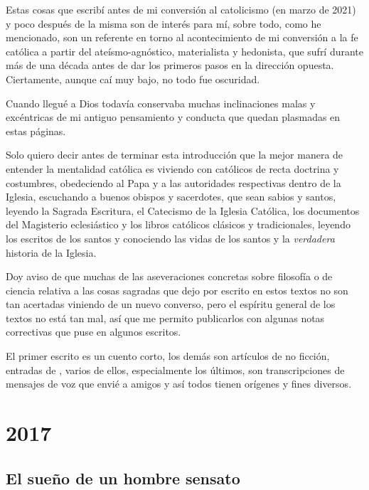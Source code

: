 \documentclass[12pt]{article}
\begin{document}
	Estas cosas que escribí antes de mi conversión al catolicismo (en marzo
	de 2021) y poco después de la misma son de interés
	 para mí, sobre todo, como he mencionado, son un
	referente en torno al acontecimiento de mi conversión a la fe católica a
	partir del ateísmo-agnóstico, materialista y hedonista, que sufrí
	durante más de una década antes de dar los primeros pasos en la
	dirección opuesta. Ciertamente, aunque caí muy bajo, no todo fue
	oscuridad.

	Cuando llegué a Dios todavía conservaba muchas inclinaciones malas y
	excéntricas de mi antiguo pensamiento y conducta que quedan plasmadas en
	estas páginas.

	Solo quiero decir antes de terminar esta introducción que la mejor
	manera de entender la mentalidad católica es viviendo con católicos de
	recta doctrina y costumbres, obedeciendo al Papa y a las autoridades
	respectivas dentro de la Iglesia, escuchando a buenos obispos y
	sacerdotes, que sean sabios y santos, leyendo la Sagrada Escritura, el
	Catecismo de la Iglesia Católica, los documentos del Magisterio
	eclesiástico y los libros católicos clásicos y tradicionales, leyendo 
	los escritos
	de los santos y conociendo las vidas de los santos y la
	\textit{verdadera} historia de la Iglesia.

	Doy aviso de que muchas de las aseveraciones concretas sobre filosofía o
	de ciencia relativa a las cosas sagradas que dejo por escrito en estos
	textos no son tan acertadas viniendo de un nuevo converso, pero el
	espíritu general de los textos no está tan mal, así que me permito
	publicarlos con algunas notas correctivas que puse en algunos
	escritos.\newline

	El primer escrito es un cuento corto, los demás son artículos de no
	ficción, entradas de , varios de ellos, especialmente
	los últimos, son transcripciones de mensajes de voz que envié a amigos y
	así todos tienen orígenes y fines diversos.

	\newpage

	\section{2017}

	\subsection{El sueño de un hombre sensato}
\end{document}
